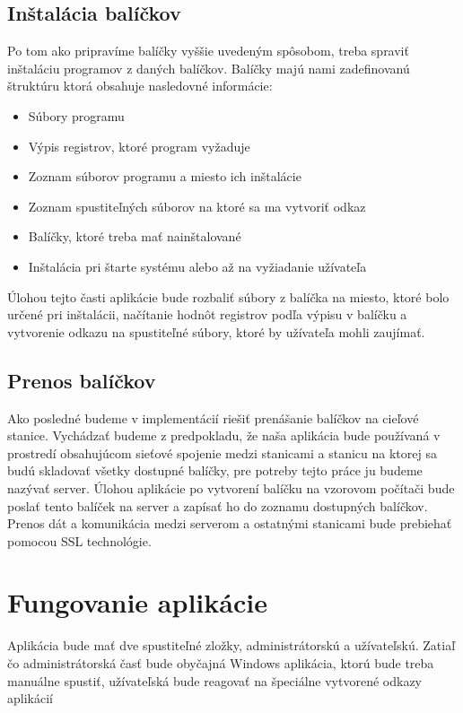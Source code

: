 \subsection{Inštalácia balíčkov}

Po tom ako pripravíme balíčky vyššie uvedeným spôsobom, treba spraviť inštaláciu programov z daných balíčkov. Balíčky majú nami zadefinovanú štruktúru ktorá obsahuje nasledovné informácie:

\begin{itemize}
\item Súbory programu
\item Výpis registrov, ktoré program vyžaduje
\item Zoznam súborov programu a miesto ich inštalácie
\item Zoznam spustiteľných súborov na ktoré sa ma vytvoriť odkaz
\item Balíčky, ktoré treba mať nainštalované
\item Inštalácia pri štarte systému alebo až na vyžiadanie užívateľa
\end{itemize}

Úlohou tejto časti aplikácie bude rozbaliť súbory z balíčka na miesto, ktoré bolo určené pri inštalácii, načítanie hodnôt registrov podľa výpisu v balíčku a vytvorenie odkazu na spustiteľné súbory, ktoré by užívateľa mohli zaujímať.

\subsection{Prenos balíčkov}

Ako posledné budeme v implementácií riešiť prenášanie balíčkov na cieľové stanice. Vychádzať budeme z predpokladu, že naša aplikácia bude používaná v prostredí obsahujúcom sieťové spojenie medzi stanicami a stanicu na ktorej sa budú skladovať všetky dostupné balíčky, pre potreby tejto práce ju budeme nazývať server. Úlohou aplikácie po vytvorení balíčku na vzorovom počítači bude poslať tento balíček na server a zapísať ho do zoznamu dostupných balíčkov. Prenos dát a komunikácia medzi serverom a ostatnými stanicami bude prebiehať pomocou SSL technológie.

\section{Fungovanie aplikácie}

Aplikácia bude mať dve spustiteľné zložky, administrátorskú a užívateľskú. Zatiaľ čo administrátorská časť bude obyčajná Windows aplikácia, ktorú bude treba manuálne spustiť, užívateľská bude reagovať na špeciálne vytvorené odkazy aplikácií
